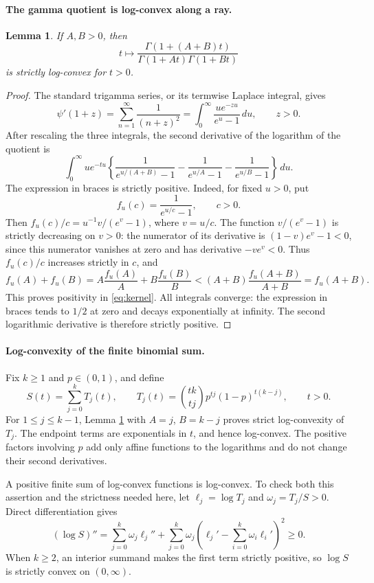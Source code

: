 \documentclass[11pt]{article}
\newtheorem{lemma}{Lemma}
\begin{document}
\paragraph{The gamma quotient is log-convex along a ray.}
\begin{lemma}\label{lem:gamma}
If \(A,B>0\), then
\[
 t\longmapsto
 \frac{\Gamma(1+(A+B)t)}{\Gamma(1+At)\Gamma(1+Bt)}
\]
is strictly log-convex for \(t>0\).
\end{lemma}
\begin{proof}
The standard trigamma series, or its termwise Laplace integral, gives
\[
 \psi'(1+z)=\sum_{n=1}^{\infty}\frac1{(n+z)^2}
          =\int_0^\infty \frac{u e^{-zu}}{e^u-1}\,du,
 \qquad z>0.
\]
After rescaling the three integrals, the second derivative of the
logarithm of the quotient is
\begin{equation}\label{eq:kernel}
 \int_0^\infty u e^{-tu}
 \left\{
 \frac1{e^{u/(A+B)}-1}
 -\frac1{e^{u/A}-1}
 -\frac1{e^{u/B}-1}
 \right\}\,du.
\end{equation}
The expression in braces is strictly positive.
Indeed, for fixed \(u>0\), put
\[
 f_u(c)=\frac1{e^{u/c}-1},\qquad c>0.
\]
Then \(f_u(c)/c=u^{-1}v/(e^v-1)\), where \(v=u/c\).
The function \(v/(e^v-1)\) is strictly decreasing on \(v>0\):
the numerator of its derivative is
\((1-v)e^v-1<0\), since this numerator vanishes at zero and
has derivative \(-ve^v<0\).
Thus \(f_u(c)/c\) increases strictly in \(c\), and
\[
 f_u(A)+f_u(B)
 =A\frac{f_u(A)}A+B\frac{f_u(B)}B
 <(A+B)\frac{f_u(A+B)}{A+B}=f_u(A+B).
\]
This proves positivity in \eqref{eq:kernel}. All integrals converge:
the expression in braces tends to \(1/2\) at zero and decays
exponentially at infinity. The second logarithmic derivative is
therefore strictly positive.
\end{proof}

\paragraph{Log-convexity of the finite binomial sum.}
Fix \(k\geq1\) and \(p\in(0,1)\), and define
\[
 S(t)=\sum_{j=0}^k T_j(t),\qquad
 T_j(t)=\binom{tk}{tj}p^{tj}(1-p)^{t(k-j)},\qquad t>0.
\]
For \(1\leq j\leq k-1\), Lemma \ref{lem:gamma} with
\(A=j\), \(B=k-j\) proves strict log-convexity of \(T_j\).
The endpoint terms are exponentials in \(t\), and hence log-convex.
The positive factors involving \(p\) add only affine functions to
the logarithms and do not change their second derivatives.

A positive finite sum of log-convex functions is log-convex. To check
both this assertion and the strictness needed here, let
\(\ell_j=\log T_j\) and \(\omega_j=T_j/S>0\). Direct differentiation gives
\begin{equation}\label{eq:sum}
 (\log S)''
 =\sum_{j=0}^k\omega_j\ell_j''
  +\sum_{j=0}^k\omega_j
       \left(\ell_j'-\sum_{i=0}^k\omega_i\ell_i'\right)^2\geq0.
\end{equation}
When \(k\geq2\), an interior summand makes the first term strictly
positive, so \(\log S\) is strictly convex on \((0,\infty)\).
\end{document}
